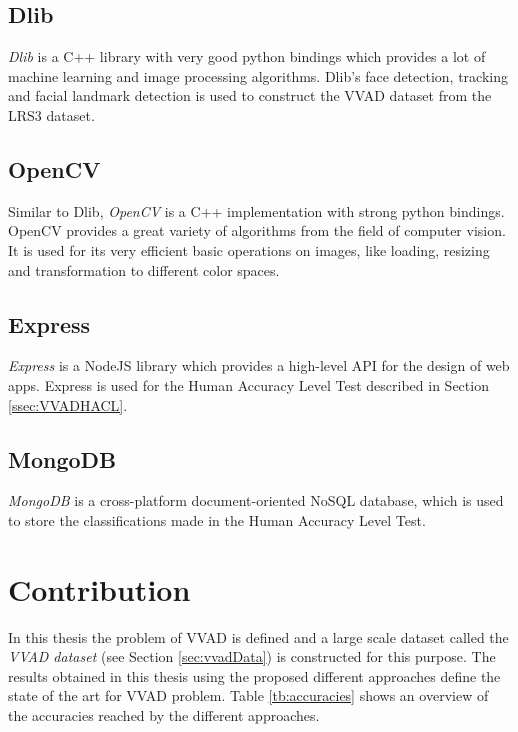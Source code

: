 \subsection{Dlib}
\emph{Dlib}\cite{Dlib} is a C++ library with very good python bindings which provides a lot of machine learning and image processing algorithms.
Dlib's face detection, tracking and facial landmark detection is used to construct the VVAD dataset from the LRS3 dataset.
\subsection{OpenCV}
Similar to Dlib, \emph{OpenCV}\cite{OpenCV} is a C++ implementation with strong python bindings. 
OpenCV provides a great variety of algorithms from the field of computer vision.
It is used for its very efficient basic operations on images, like loading, resizing and transformation to different color spaces.
\subsection{Express}
\emph{Express}\cite{EXPRESS} is a NodeJS library which provides a high-level API for the design of web apps.
Express is used for the Human Accuracy Level Test described in Section \ref{ssec:VVADHACL}.
\subsection{MongoDB}
\emph{MongoDB}\cite{MONGO} is a cross-platform document-oriented NoSQL database, which is used to store the classifications made in the Human Accuracy Level Test.

\section{Contribution}
In this thesis the problem of VVAD is defined and a large scale dataset called the \emph{VVAD dataset} (see Section \ref{sec:vvadData}) is constructed for this purpose.
The results obtained in this thesis using the proposed different approaches define the state of the art for VVAD problem.
Table \ref{tb:accuracies} shows an overview of the accuracies reached by the different approaches.


%


